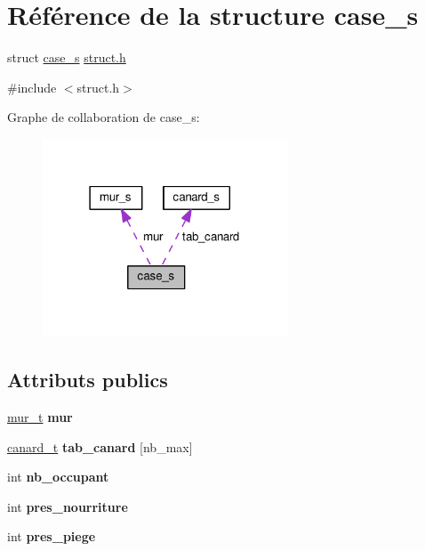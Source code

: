 \hypertarget{structcase__s}{}\section{Référence de la structure case\+\_\+s}
\label{structcase__s}


struct \hyperlink{structcase__s}{case\+\_\+s} \hyperlink{struct_8h_source}{struct.\+h}  




{\ttfamily \#include $<$struct.\+h$>$}



Graphe de collaboration de case\+\_\+s\+:\nopagebreak
\begin{figure}[H]
\begin{center}
\leavevmode
\includegraphics[width=207pt]{structcase__s__coll__graph}
\end{center}
\end{figure}
\subsection*{Attributs publics}
\begin{DoxyCompactItemize}
\item 
\hyperlink{structmur__s}{mur\+\_\+t} {\bfseries mur}\hypertarget{structcase__s_abdc07d37e4d9b61e001331ade6b389ea}{}\label{structcase__s_abdc07d37e4d9b61e001331ade6b389ea}

\item 
\hyperlink{structcanard__s}{canard\+\_\+t} {\bfseries tab\+\_\+canard} \mbox{[}nb\+\_\+max\mbox{]}\hypertarget{structcase__s_aae0820a1cce02a09249c9078bd50d4e8}{}\label{structcase__s_aae0820a1cce02a09249c9078bd50d4e8}

\item 
int {\bfseries nb\+\_\+occupant}\hypertarget{structcase__s_a3afb11c4122087e0686451fbaefebb2e}{}\label{structcase__s_a3afb11c4122087e0686451fbaefebb2e}

\item 
int {\bfseries pres\+\_\+nourriture}\hypertarget{structcase__s_a550d1707850b0078d6bad63cdce01fa3}{}\label{structcase__s_a550d1707850b0078d6bad63cdce01fa3}

\item 
int {\bfseries pres\+\_\+piege}\hypertarget{structcase__s_a8ac60b2215c63b94f4d83fd4085bbda5}{}\label{structcase__s_a8ac60b2215c63b94f4d83fd4085bbda5}

\end{DoxyCompactItemize}


